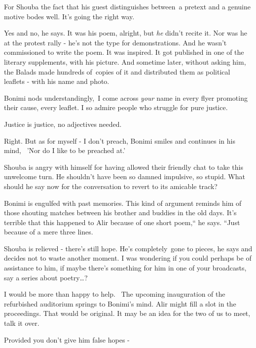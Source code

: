 \documentclass[12pt]{book}
\begin{document}
For Shouba the fact that his guest distinguishes between~a pretext and a genuine motive bodes well. It's going the right
way.

{\textquotedbl}Yes and no,{\textquotedbl} he says. {\textquotedbl}It was his poem, alright, but \textit{he} didn't
recite it. Nor was he at the protest rally - he's not the type for demonstrations. And he wasn't commissioned to write
the poem. It was inspired. It got published in one of the literary supplements, with his picture. And sometime later,
without asking him, the Balads made hundreds of~copies of it and distributed them as political leaflets - with his name
and photo.{\textquotedbl}

Bonimi nods understandingly,~{\textquotedbl}I come across \textit{your }name in every flyer promoting their cause, every
leaflet. I so admire people who struggle for pure justice.{\textquotedbl}

{\textquotedbl}Justice is justice, no adjectives needed.{\textquotedbl}

{\textquotedbl}Right. But as for myself - I don't preach,{\textquotedbl} Bonimi smiles and continues in his mind,
\ {}'Nor do I like to be preached at.'

Shouba is angry with himself for having allowed their friendly chat to take this unwelcome turn. He shouldn't have been
so damned impulsive, so stupid. What should he say now for the conversation to revert to its amicable track?

Bonimi is engulfed with past memories. This kind of argument reminds him of those shouting matches between his brother
and buddies in the old days. It's terrible that this happened to Alir because of one short poem,`` he says. ``Just
because of{ }{a }mere three lines.{\textquotedbl}{\textquotedbl}

Shouba is relieved - there's still hope. {\textquotedbl}He's completely~gone to pieces,{\textquotedbl} he says and
decides not to waste another moment. {\textquotedbl}I was wondering if you could perhaps be of assistance to him, if
maybe there's something for him in one of your broadcasts, say a series about poetry{\dots}?{\textquotedbl}

{\textquotedbl}I would be more than happy to help.{\textquotedbl} \ The upcoming inauguration of the refurbished
auditorium springs to Bonimi's mind. Alir might fill a slot in the proceedings. That would be original.
{\textquotedbl}It may be an idea for the two of us to meet, talk it over.{\textquotedbl}

{\textquotedbl}Provided you don't give him false hopes -{\textquotedbl}
\end{document}
